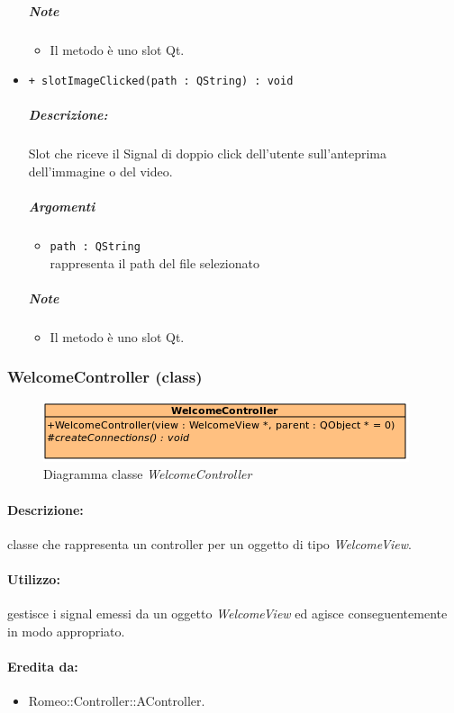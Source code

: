 \begin{itemize}
			\subparagraph{Note}
			\begin{itemize}
				\item Il metodo è uno slot\g{} Qt\g{}.
			\end{itemize}
			\item \color{blue} \verb!+ slotImageClicked(path : QString) : void!
			\color{black}
			\subparagraph{Descrizione:} Slot\g{} che riceve il Signal\g{} di doppio click dell'utente sull'anteprima dell'immagine o del video.
			\color{black}
			\subparagraph{Argomenti}
			\begin{itemize}
				\item \color{RoyalPurple} \verb!path : QString!\\				
\color{black} rappresenta il path del file selezionato
			\end{itemize}
			\subparagraph{Note}
			\begin{itemize}
				\item Il metodo è uno slot\g{} Qt\g{}.
			\end{itemize}
		\end{itemize}
		\pagebreak
	\subsubsection{WelcomeController (class)}
	\begin{figure}[!h]
		\centering
		\includegraphics[width=0.6\linewidth]{./Content/Immagini/controller/WelcomeController}
		\caption{Diagramma classe \textsl{WelcomeController}}
	\end{figure}
	\paragraph{Descrizione:} classe che rappresenta un controller per un oggetto di tipo \textsl{WelcomeView}.
	\paragraph{Utilizzo:} gestisce i signal\g{} emessi da un oggetto \textsl{WelcomeView} ed agisce conseguentemente in modo appropriato.
	\paragraph{Eredita da:}
		\begin{itemize}
			\item Romeo::Controller::AController.
		\end{itemize}
